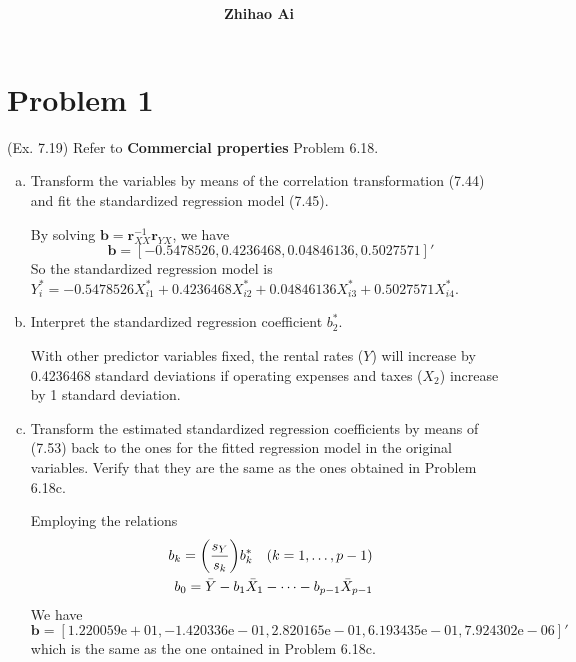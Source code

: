 \documentclass[10pt]{report}
\title{
	\vspace{2in}
	\textmd{\textbf{\hwCourse\\\hwTitle}}\\
	\vspace{0.3in}\large{\textit{\hmClassInstructor}}
	\vspace{3in}
}
\author{\textbf{Zhihao Ai}}
\date{}
\DeclarePairedDelimiter\autoparen{(}{)}
\newcommand{\pa}[1]{\autoparen*{#1}}
\newcommand{\m}[1] {\mathbf{#1}}
\begin{document}
\maketitle

\section*{Problem 1}
(Ex. 7.19) Refer to \textbf{Commercial properties}  Problem 6.18.
\begin{enumerate}[a.]
	\item 
	Transform the variables by means of the correlation transformation (7.44) and fit the standardized regression model (7.45).
	
	By solving $\m{b} = \m{r}^{-1}_{XX} \m{r}^{}_{YX}$, we have
	\[
	\m{b} = [-0.5478526, 0.4236468, 0.04846136, 0.5027571]'
	\]
	So the standardized regression model is $Y^*_i = -0.5478526 X^*_{i1} + 0.4236468 X^*_{i2} + 0.04846136 X^*_{i3} + 0.5027571 X^*_{i4}$.
	
	\item 
	Interpret the standardized regression coefficient $b^*_2$.
	
	With other predictor variables fixed, the rental rates ($Y$) will increase by 0.4236468 standard deviations if operating expenses and taxes ($X_2$) increase by 1 standard deviation.
	
	\item 
	Transform the estimated standardized regression coefficients by means of (7.53) back to the ones for the fitted regression model in the original variables. Verify that they are the same as the ones obtained in Problem 6.18c.
	
	Employing the relations
	\begin{align*}
		b_k = \pa{\frac{s_Y}{s_k}} b^*_k \quad (k=1,\dots,p-1)\\
		b_0 = \bar{Y} - b_1 \bar{X}_1 - \dots - b_{p-1} \bar{X}_{p-1}
	\end{align*}
	We have
	\[
	\m{b} = [1.220059\mathrm{e}+01, -1.420336\mathrm{e}-01, 2.820165\mathrm{e}-01, 6.193435\mathrm{e}-01, 7.924302\mathrm{e}-06]'
	\]
	which is the same as the one ontained in Problem 6.18c.
\end{enumerate}
\end{document}
